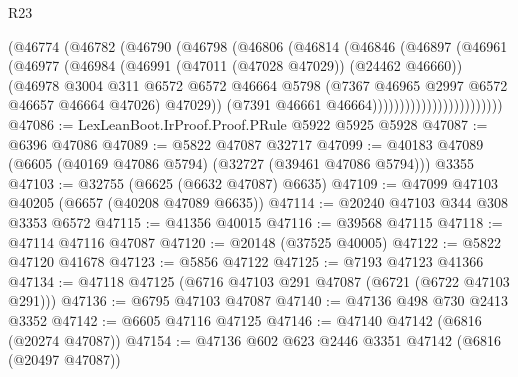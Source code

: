 \begin{lexlean}{R23}
\begin{coremodule}
                              (@46774
                                (@46782
                                  (@46790
                                    (@46798
                                      (@46806
                                        (@46814
                                          (@46846
                                            (@46897
                                              (@46961
                                                (@46977
                                                  (@46984
                                                    (@46991
                                                      (@47011 (@47028 @47029))
                                                      (@24462 @46660))
                                                    (@46978
                                                      @3004
                                                      @311
                                                      @6572
                                                      @6572
                                                      @46664
                                                      @5798
                                                      (@7367
                                                        @46965
                                                        @2997
                                                        @6572
                                                        @46657
                                                        @46664
                                                        @47026)
                                                      @47029))
                                                  (@7391 @46661 @46664))))))))))))))))))))))))
@47086 := LexLeanBoot.IrProof.Proof.PRule @5922 @5925 @5928
@47087 := @6396 @47086
@47089 := @5822 @47087 @32717
@47099 := @40183 @47089 (@6605 (@40169 @47086 @5794) (@32727 (@39461 @47086 @5794))) @3355
@47103 := @32755 (@6625 (@6632 @47087) @6635)
@47109 := @47099 @47103 @40205 (@6657 (@40208 @47089 @6635))
@47114 := @20240 @47103 @344 @308 @3353 @6572
@47115 := @41356 @40015
@47116 := @39568 @47115
@47118 := @47114 @47116 @47087
@47120 := @20148 (@37525 @40005)
@47122 := @5822 @47120 @41678
@47123 := @5856 @47122
@47125 := @7193 @47123 @41366
@47134 := @47118 @47125 (@6716 @47103 @291 @47087 (@6721 (@6722 @47103 @291)))
@47136 := @6795 @47103 @47087
@47140 := @47136 @498 @730 @2413 @3352
@47142 := @6605 @47116 @47125
@47146 := @47140 @47142 (@6816 (@20274 @47087))
@47154 := @47136 @602 @623 @2446 @3351 @47142 (@6816 (@20497 @47087))

\end{coremodule}
\end{lexlean}
